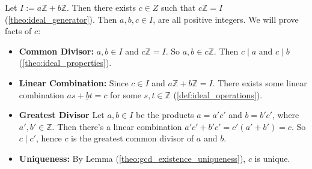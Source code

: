 \begin{Proof}
    Let $I:=a\mathbb{Z} + b\mathbb{Z}$. Then there exists $c\in Z$ such that $c\mathbb{Z} = I$ (\ref{theo:ideal_generator}). Then $a,b,c\in I$, are all
    positive integers. We will prove facts of $c$:
    \begin{itemize}
        \item \textbf{Common Divisor: }$a,b\in I$ and $c\mathbb{Z}=I$. So $a,b\in c\mathbb{Z}$. Then $c\mid a$ and $c\mid b$ (\ref{theo:ideal_properties}).
        \item \textbf{Linear Combination:} Since $c\in I$ and $a\mathbb{Z} + b\mathbb{Z} = I$. There exists some linear combination $\underline{as+bt=c}$ for some $s,t\in\mathbb{Z}$ (\ref{def:ideal_operations}).
        \item \textbf{Greatest Divisor} Let $a,b\in I$ be the products $a=a'c'$ and $b=b'c'$, where $a',b'\in\mathbb{Z}$.
              Then there's a linear combination $a'c'+b'c'=c'(a'+b')=c$. So $c\mid c'$, hence $c$ is the greatest common divisor of $a$ and $b$.
        \item \textbf{Uniqueness:} By Lemma (\ref{theo:gcd_existence_uniqueness}), $c$ is unique.
    \end{itemize}
\end{Proof}

